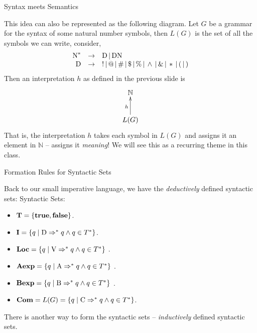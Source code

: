 \documentclass{beamer}
\begin{document}
\begin{frame}{Syntax meets Semantics}
\small

This idea can also be represented as the following diagram.  Let $G$ be a grammar for the syntax of some natural number symbols,
then $L(G)$ is the set of all the symbols we can write, consider,
{\scriptsize
\[
\begin{array}{rcl}
\mbox{N}^* &\rightarrow& \mbox{D} \,|\, \mbox{D}\mbox{N}\\
\mbox{D} &\rightarrow& ! \,|\, @ \,|\, \# \,|\, \$ \,|\, \% \,|\, \wedge \,|\, \& \,|\, * \,|\, ( \,|\, )
\end{array}
\]
}
Then an interpretation $h$ as defined in the previous slide is
\[
\xymatrix{
\mathbb{N}\\
L(G)\ar[u]^h
}
\]
That is, the interpretation $h$ takes each symbol in $L(G)$ and assigns it an element in $\mathbb{N}$ -- assigns it {\em meaning}!
We will see this as a recurring theme in this class.
\end{frame}


\begin{frame}{Formation Rules for Syntactic Sets}
\small

Back to our small imperative language, we have the {\em deductively} defined syntactic sets:
Syntactic Sets:
\begin{itemize}
\item $\mbox{\bf T} = \{  \mbox{\bf true} ,\mbox{\bf false} \}$.
\item $\mbox{\bf I} = \{ q \mid \mbox{D} \Rightarrow^* q \wedge q \in T^*\}$.
\item $\mbox{\bf Loc} = \{ q \mid \mbox{V} \Rightarrow^* q \wedge q \in T^*\}$ .
\item $\mbox{\bf Aexp} = \{ q \mid \mbox{A} \Rightarrow^* q \wedge q \in T^*\}$ .
\item $\mbox{\bf Bexp} = \{ q \mid \mbox{B} \Rightarrow^* q \wedge q \in T^*\}$ .
\item $\mbox{\bf Com} = L(G) = \{ q \mid \mbox{C} \Rightarrow^* q \wedge q \in T^*\}$.
\end{itemize}

There is another way to form the syntactic sets -- {\em inductively} defined syntactic sets.

\end{frame}
\end{document}
